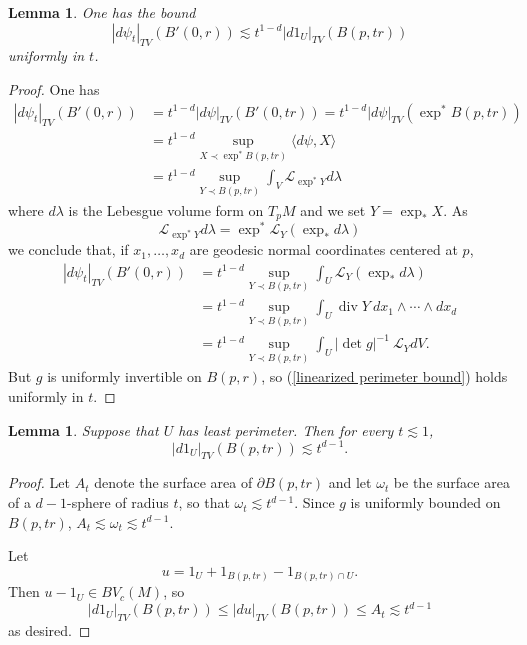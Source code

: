 \documentclass[reqno,12pt,letterpaper]{amsart}
\DeclareMathOperator{\Div}{div}
\newtheorem{lemma}[theorem]{Lemma}
\theoremstyle{definition}
\numberwithin{equation}{section}
\begin{document}
\begin{lemma}\label{linearized perimeter bound 1}
One has the bound
\begin{equation}
\label{linearized perimeter bound}
|d\psi_t|_{TV}(B'(0, r)) \lesssim t^{1 - d} |d1_U|_{TV}(B(p, tr))
\end{equation}
uniformly in $t$.
\end{lemma}
\begin{proof}
One has
\begin{align*}
|d\psi_t|_{TV}(B'(0, r)) &= t^{1 - d} |d\psi|_{TV}(B'(0, tr)) = t^{1 - d} |d\psi|_{TV}(\exp^* B(p, tr))\\
&= t^{1 - d} \sup_{X \prec \exp^* B(p, tr)} \langle d\psi, X\rangle\\
&= t^{1 - d} \sup_{Y \prec B(p, tr)} \int_V \mathcal L_{\exp^* Y}d\lambda
\end{align*}
where $d\lambda$ is the Lebesgue volume form on $T_pM$ and we set $Y = \exp_* X$.
As
$$\mathcal L_{\exp^* Y}d\lambda = \exp^* \mathcal L_Y(\exp_* d\lambda)$$
we conclude that, if $x_1, \dots, x_d$ are geodesic normal coordinates centered at $p$,
\begin{align*}
|d\psi_t|_{TV}(B'(0, r)) &= t^{1 - d} \sup_{Y \prec B(p, tr)} \int_U \mathcal L_Y(\exp_* d\lambda)\\
&= t^{1 - d} \sup_{Y \prec B(p, tr)} \int_U \Div Y ~dx_1 \wedge \cdots \wedge dx_d\\
&= t^{1 - d} \sup_{Y \prec B(p, tr)} \int_U |\det g|^{-1} ~\mathcal L_YdV.
\end{align*}
But $g$ is uniformly invertible on $B(p, r)$, so (\ref{linearized perimeter bound}) holds uniformly in $t$.
\end{proof}

\begin{lemma}\label{linearized perimeter bound 2}
Suppose that $U$ has least perimeter. Then for every $t \lesssim 1$,
$$|d1_U|_{TV}(B(p, tr)) \lesssim t^{d - 1}.$$
\end{lemma}
\begin{proof}
Let $A_t$ denote the surface area of $\partial B(p, tr)$ and let $\omega_t$ be the surface area of a $d-1$-sphere of radius $t$, so that $\omega_t \lesssim t^{d - 1}$.
Since $g$ is uniformly bounded on $B(p, tr)$, $A_t \lesssim \omega_t \lesssim t^{d - 1}$.

Let
$$u = 1_U + 1_{B(p, tr)} - 1_{B(p, tr) \cap U}.$$
Then $u - 1_U \in BV_c(M)$, so
$$|d1_U|_{TV}(B(p, tr)) \leq |du|_{TV}(B(p, tr)) \leq A_t \lesssim t^{d - 1}$$
as desired.
\end{proof}
\end{document}
